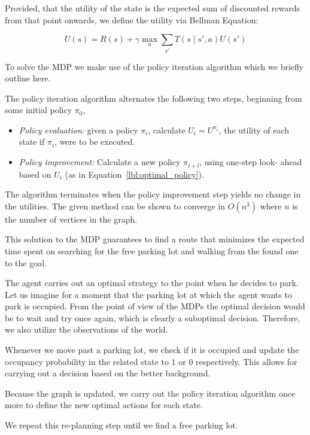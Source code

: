Provided, that the utility of the state is the expected sum of discounted
rewards from that point onwards, we define the utility via Bellman Equation:

\begin{equation}
\label{lbl:bellman_equation}
U(s) = R(s) + \gamma \max_a \sum_{s'}T(s \mid s', a)U(s')
\end{equation}

To solve the MDP we make use of the policy iteration algorithm which we
briefly outline here.

The policy iteration algorithm alternates the following two steps, beginning
from some initial policy $\pi_0$,

\begin{itemize}
    \item \emph{Policy evaluation:} given a policy $\pi_i$,
    calculate $U_i = U^{\pi_i}$, the utility of each state if $\pi_i$, were to be
    executed.
    \item \emph{Policy improvement:} Calculate a new policy
    $\pi_{i+l}$, using one-step look- ahead based on $U_i$ (as in
    Equation~\ref{lbl:optimal_policy}).
\end{itemize}

The algorithm terminates when the policy improvement step yields no change in
the utilities. The given method can be shown to converge in $O(n^3)$ where $n$
is the number of vertices in the graph.

This solution to the MDP guarantees to find a route that minimizes the
expected time spent on searching for the free parking lot and walking from the
found one to the goal.


The agent carries out an optimal strategy to the point when he decides to
park. Let us imagine for a moment that the parking lot at which the agent
wants to park is occupied. From the point of view of the MDPs the optimal
decision would be to wait and try once again, which is clearly a suboptimal
decision. Therefore, we also utilize the observations of the world.

Whenever we move past a parking lot, we check if it is occupied and update
the occupancy probability in the related state to 1 or 0 respectively.
This allows for carrying out a decision based on the better background.

Because the graph is updated, we carry out the policy iteration algorithm
once more to define the new optimal actions for each state.

We repeat this re-planning step until we find a free parking lot.

